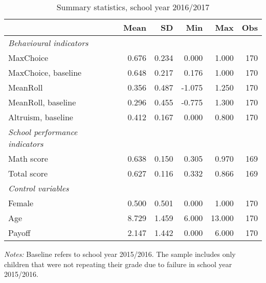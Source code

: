 \begin{table} \centering
	\caption{Summary statistics, school year 2016/2017}
	\begin{threeparttable}
		\centering
		\begin{tabular}{l*{5}{D{.}{.}{-1}}} 
			\toprule
	&       Mean&          SD&      Min 	&		Max			& Obs	\\
			\toprule			
\textit{Behavioural indicators} &&&&& \\
MaxChoice           &       0.676&       0.234&       0.000&       1.000&         170\\
MaxChoice, baseline &       0.648&       0.217&       0.176&       1.000&         170\\
MeanRoll            &       0.356&       0.487&      -1.075&       1.250&         170\\
MeanRoll, baseline  &       0.296&       0.455&      -0.775&       1.300&         170\\
Altruism, baseline  &       0.412&       0.167&       0.000&       0.800&         170\\ 
\midrule
\textit{School performance indicators} &&&&& \\
Math score          &       0.638&       0.150&       0.305&       0.970&         169\\
Total score         &       0.627&       0.116&       0.332&       0.866&         169\\
\midrule
\textit{Control variables} &&&&& \\ 
Female              &       0.500&       0.501&       0.000&       1.000&         170\\
Age                 &       8.729&       1.459&       6.000&      13.000&         170\\
Payoff              &       2.147&       1.442&       0.000&       6.000&         170\\
\bottomrule
\end{tabular}
\begin{tablenotes}
\footnotesize
\textit{Notes:} Baseline refers to school year 2015/2016. The sample includes only children that were not repeating their grade due to failure in school year 2015/2016.
\end{tablenotes}
\end{threeparttable}
\label{tab:sumstat}
\end{table}